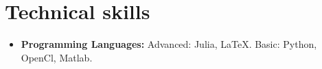 \documentclass[11pt,a4paper,sans]{moderncv}        %
\begin{document}
\section{Technical skills}

\vspace{6pt}

\begin{itemize}

\item \textbf{Programming Languages:} Advanced: Julia, LaTeX. Basic: Python,  OpenCl, Matlab.







\end{itemize}




\end{document}
